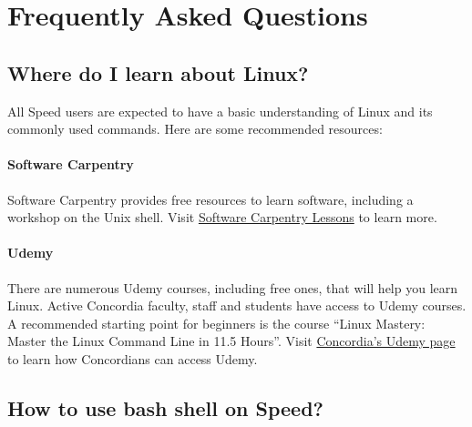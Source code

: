 \section{Frequently Asked Questions}
\label{sect:faqs}

\subsection{Where do I learn about Linux?}
\label{sect:faqs-linux}

All Speed users are expected to have a basic understanding of Linux and its commonly used commands.
Here are some recommended resources:

\paragraph*{Software Carpentry}

Software Carpentry provides free resources to learn software, including a workshop on the Unix shell.
Visit \href{https://software-carpentry.org/lessons/}{Software Carpentry Lessons} to learn more.

\paragraph*{Udemy}

There are numerous Udemy courses, including free ones, that will help you learn Linux. 
Active Concordia faculty, staff and students have access to Udemy courses. 
A recommended starting point for beginners is the course ``Linux Mastery: Master the Linux Command Line in 11.5 Hours''.
Visit \href{https://www.concordia.ca/it/services/udemy.html}{Concordia's Udemy page} to learn how Concordians can access Udemy.

\subsection{How to use bash shell on Speed?}
\label{sect:faqs-bash}

